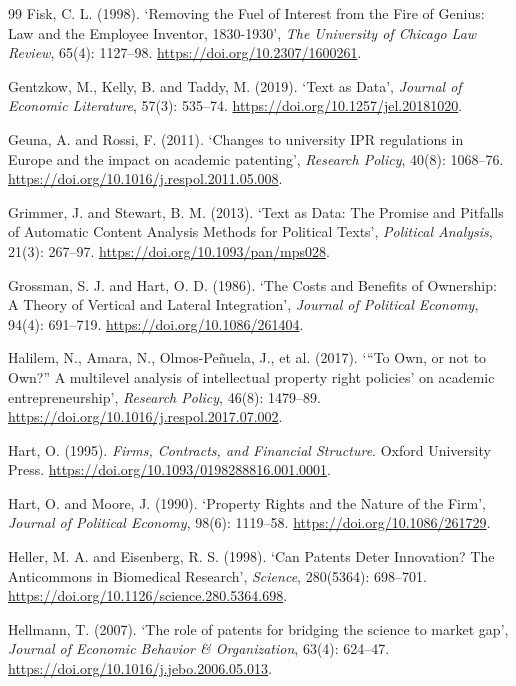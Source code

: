 \begin{thebibliography}{99}
 Fisk, C. L. (1998). `Removing the Fuel of Interest from the Fire of Genius: Law and the Employee Inventor, 1830-1930', \emph{The University of Chicago Law Review}, 65(4): 1127--98. \url{https://doi.org/10.2307/1600261}.

 Gentzkow, M., Kelly, B. and Taddy, M. (2019). `Text as Data', \emph{Journal of Economic Literature}, 57(3): 535--74. \url{https://doi.org/10.1257/jel.20181020}.

 Geuna, A. and Rossi, F. (2011). `Changes to university IPR regulations in Europe and the impact on academic patenting', \emph{Research Policy}, 40(8): 1068--76. \url{https://doi.org/10.1016/j.respol.2011.05.008}.

 Grimmer, J. and Stewart, B. M. (2013). `Text as Data: The Promise and Pitfalls of Automatic Content Analysis Methods for Political Texts', \emph{Political Analysis}, 21(3): 267--97. \url{https://doi.org/10.1093/pan/mps028}.

 Grossman, S. J. and Hart, O. D. (1986). `The Costs and Benefits of Ownership: A Theory of Vertical and Lateral Integration', \emph{Journal of Political Economy}, 94(4): 691--719. \url{https://doi.org/10.1086/261404}.

 Halilem, N., Amara, N., Olmos-Peñuela, J., et al. (2017). `“To Own, or not to Own?” A multilevel analysis of intellectual property right policies' on academic entrepreneurship', \emph{Research Policy}, 46(8): 1479--89. \url{https://doi.org/10.1016/j.respol.2017.07.002}.

 Hart, O. (1995). \emph{Firms, Contracts, and Financial Structure}. Oxford University Press. \url{https://doi.org/10.1093/0198288816.001.0001}.

 Hart, O. and Moore, J. (1990). `Property Rights and the Nature of the Firm', \emph{Journal of Political Economy}, 98(6): 1119--58. \url{https://doi.org/10.1086/261729}.

 Heller, M. A. and Eisenberg, R. S. (1998). `Can Patents Deter Innovation? The Anticommons in Biomedical Research', \emph{Science}, 280(5364): 698--701. \url{https://doi.org/10.1126/science.280.5364.698}.

 Hellmann, T. (2007). `The role of patents for bridging the science to market gap', \emph{Journal of Economic Behavior \& Organization}, 63(4): 624--47. \url{https://doi.org/10.1016/j.jebo.2006.05.013}.


\end{thebibliography}
